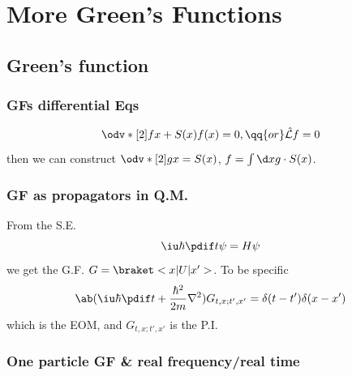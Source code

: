 
\chapter{More Green's Functions}

\section{Green's function}

\subsection{GFs differential Eqs}

\begin{equation}
  \odv*[2]fx + S(x) f(x) = 0, \qq{or} \hat{\mathcal L} f = 0
\end{equation}
then we can construct $\odv*[2]gx = S(x)$, $f = \int \d x g \cdot S(x)$.

\subsection{GF as propagators in Q.M.}

From the S.E.
\[
  \iu \hbar \pdif t\psi = H\psi
\]
we get the G.F. $G = \braket<x|U|x'>$. To be specific
\begin{equation}
  \ab(\iu\hbar \pdif t + \frac{\hbar^2}{2m}\nabla^2) G_{t,x;t',x'} = \delta(t - t') \delta(x - x')
\end{equation}
which is the EOM, and $G_{t,x;t',x'}$ is the P.I.

\subsection{One particle GF \&  real frequency/real time}

